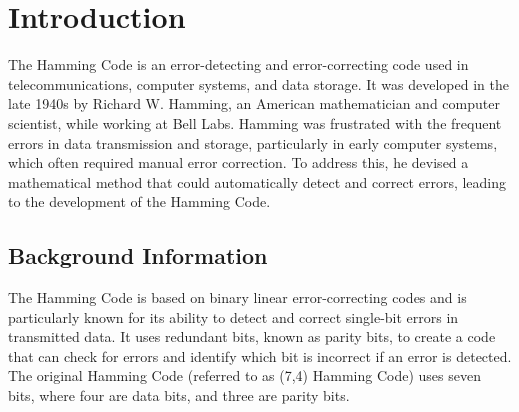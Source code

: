 \documentclass{article}
\begin{document}
\maketitle
        \vspace{-2.5cm}
\titleGP %
    
\clearpage
	
	

\tableofcontents
	\thispagestyle{empty}
	\cleardoublepage
	\typeout{}




   
     


\section{Introduction}
The Hamming Code is an error-detecting and error-correcting code used in telecommunications, computer systems, and data storage. It was developed in the late 1940s by Richard W. Hamming, an American mathematician and computer scientist, while working at Bell Labs. Hamming was frustrated with the frequent errors in data transmission and storage, particularly in early computer systems, which often required manual error correction. To address this, he devised a mathematical method that could automatically detect and correct errors, leading to the development of the Hamming Code.
\cite{6772729}



\subsection{Background Information}
The Hamming Code is based on binary linear error-correcting codes and is particularly known for its ability to detect and correct single-bit errors in transmitted data. It uses redundant bits, known as parity bits, to create a code that can check for errors and identify which bit is incorrect if an error is detected. The original Hamming Code (referred to as (7,4) Hamming Code) uses seven bits, where four are data bits, and three are parity bits.
\end{document}
